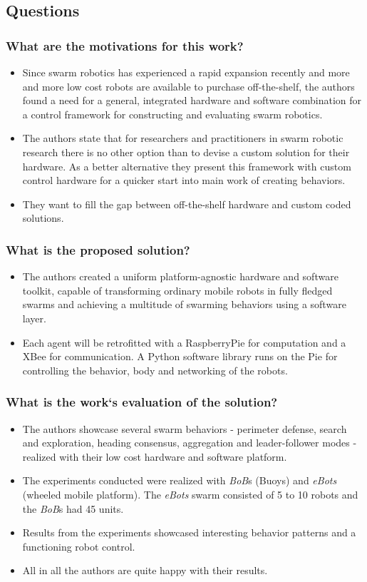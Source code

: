 \documentclass{article}
\begin{document}
\subsection*{Questions}
\subsubsection*{What are the motivations for this work?}
\begin{itemize}
    \item Since swarm robotics has experienced a rapid expansion recently and more and more low cost robots are available to purchase off-the-shelf, the authors found a need for a general, integrated hardware and software combination for a control framework for constructing and evaluating swarm robotics.
    \item The authors state that for researchers and practitioners in swarm robotic research there is no other option than to devise a custom solution for their hardware. As a better alternative they present this framework with custom control hardware for a quicker start into main work of creating behaviors.
    \item They want to fill the gap between off-the-shelf hardware and custom coded solutions.
\end{itemize}
\subsubsection*{What is the proposed solution?}
\begin{itemize}
    \item The authors created a uniform platform-agnostic hardware and software toolkit, capable of transforming ordinary mobile robots in fully fledged swarms and achieving a multitude of swarming behaviors using a software layer.
    \item Each agent will be retrofitted with a RaspberryPie for computation and a XBee for communication. A Python software library runs on the Pie for controlling the behavior, body and networking of the robots.
\end{itemize}
\subsubsection*{What is the work`s evaluation of the solution?}
\begin{itemize}
    \item The authors showcase several swarm behaviors - perimeter defense, search and exploration, heading consensus, aggregation and leader-follower modes - realized with their low cost hardware and software platform.
    \item The experiments conducted were realized with \emph{BoB}s (Buoys) and \emph{eBots} (wheeled mobile platform). The \emph{eBots} swarm consisted of 5 to 10 robots and the \emph{BoB}s  had 45 units. 
    \item Results from the experiments showcased interesting behavior patterns and a functioning robot control.
    \item All in all the authors are quite happy with their results.
\end{itemize}
\end{document}
